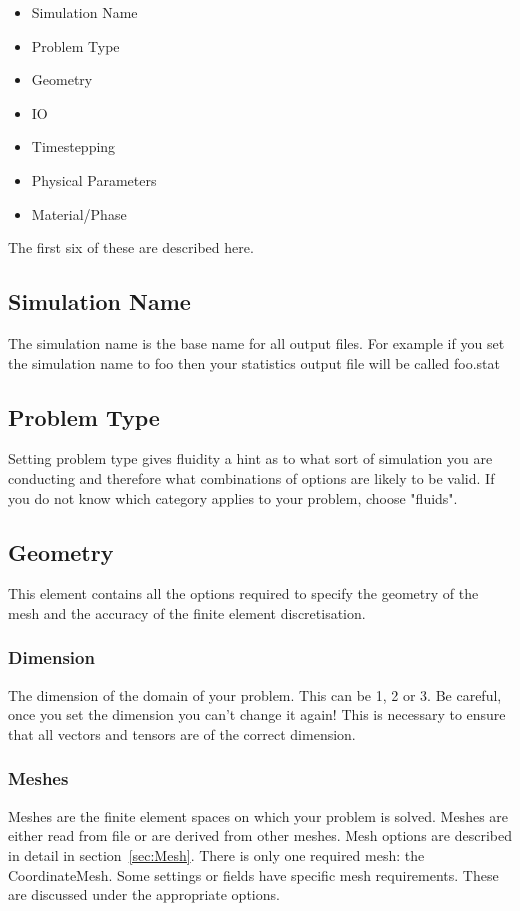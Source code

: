 \begin{itemize}
\item Simulation Name
\item Problem Type
\item Geometry
\item IO
\item Timestepping
\item Physical Parameters
\item Material/Phase
\end{itemize}

The first six of these are described here.

\subsection{Simulation Name}
The simulation name is the base name for all output files. For example if you set the simulation name to foo then your statistics output file will be called foo.stat

\subsection{Problem Type}
Setting problem type gives fluidity a hint as to what sort of simulation you are conducting and therefore what combinations of options are likely to be valid. If you do not know which category applies to your problem, choose "fluids".
\subsection{Geometry}
This element contains all the options required to specify the geometry of the mesh and the accuracy of the finite element discretisation.

\subsubsection{Dimension}
The dimension of the domain of your problem. This can be 1, 2 or 3.
Be careful, once you set the dimension you can't change it again!
This is necessary to ensure that all vectors and tensors are of the correct
dimension.

\subsubsection{Meshes} \label{sec:mesh_configuration}
Meshes are the finite element spaces on which your problem is solved. Meshes
are either read from file or are derived from other meshes. Mesh options are
described in detail in section~\ref{sec:Mesh}.  There is only one required
mesh: the CoordinateMesh. Some settings or fields have
specific mesh requirements. These are discussed under the appropriate
options.

